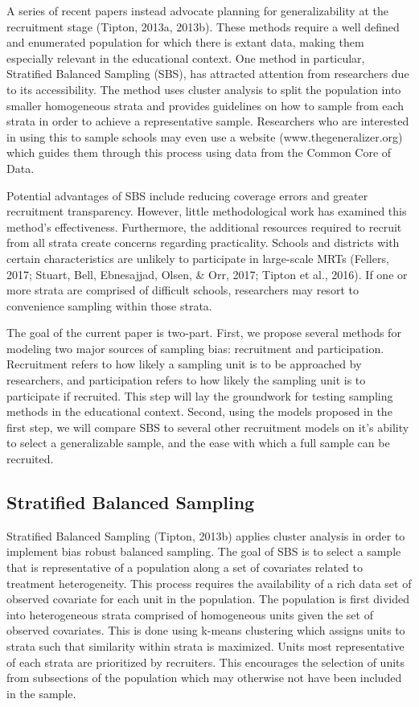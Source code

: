 \documentclass[man,floatsintext]{apa6}
\theoremstyle{definition}
\theoremstyle{definition}
\theoremstyle{definition}
\theoremstyle{remark}
\begin{document}
A series of recent papers instead advocate planning for generalizability
at the recruitment stage (Tipton, 2013a, 2013b). These methods require a
well defined and enumerated population for which there is extant data,
making them especially relevant in the educational context. One method
in particular, Stratified Balanced Sampling (SBS), has attracted
attention from researchers due to its accessibility. The method uses
cluster analysis to split the population into smaller homogeneous strata
and provides guidelines on how to sample from each strata in order to
achieve a representative sample. Researchers who are interested in using
this to sample schools may even use a website (www.thegeneralizer.org)
which guides them through this process using data from the Common Core
of Data.

Potential advantages of SBS include reducing coverage errors and greater
recruitment transparency. However, little methodological work has
examined this method's effectiveness. Furthermore, the additional
resources required to recruit from all strata create concerns regarding
practicality. Schools and districts with certain characteristics are
unlikely to participate in large-scale MRTs (Fellers, 2017; Stuart,
Bell, Ebnesajjad, Olsen, \& Orr, 2017; Tipton et al., 2016). If one or
more strata are comprised of difficult schools, researchers may resort
to convenience sampling within those strata.

The goal of the current paper is two-part. First, we propose several
methods for modeling two major sources of sampling bias: recruitment and
participation. Recruitment refers to how likely a sampling unit is to be
approached by researchers, and participation refers to how likely the
sampling unit is to participate if recruited. This step will lay the
groundwork for testing sampling methods in the educational context.
Second, using the models proposed in the first step, we will compare SBS
to several other recruitment models on it's ability to select a
generalizable sample, and the ease with which a full sample can be
recruited.

\hypertarget{stratified-balanced-sampling}{%
\subsection{Stratified Balanced
Sampling}\label{stratified-balanced-sampling}}

Stratified Balanced Sampling (Tipton, 2013b) applies cluster analysis in
order to implement bias robust balanced sampling. The goal of SBS is to
select a sample that is representative of a population along a set of
covariates related to treatment heterogeneity. This process requires the
availability of a rich data set of observed covariate for each unit in
the population. The population is first divided into heterogeneous
strata comprised of homogeneous units given the set of observed
covariates. This is done using k-means clustering which assigns units to
strata such that similarity within strata is maximized. Units most
representative of each strata are prioritized by recruiters. This
encourages the selection of units from subsections of the population
which may otherwise not have been included in the sample.
\end{document}
